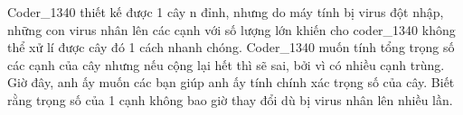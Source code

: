 Coder\_1340 thiết kế được 1 cây n đỉnh, nhưng do máy tính bị virus đột nhập, những con virus nhân lên các cạnh với số lượng lớn khiến cho coder\_1340 không thể xử lí được cây đó 1 cách nhanh chóng. Coder\_1340 muốn tính tổng trọng số các cạnh của cây nhưng nếu cộng lại hết thì sẽ sai, bởi vì có nhiều cạnh trùng. Giờ đây, anh ấy muốn các bạn giúp anh ấy tính chính xác trọng số của cây. Biết rằng trọng số của 1 cạnh không bao giờ thay đổi dù bị virus nhân lên nhiều lần.